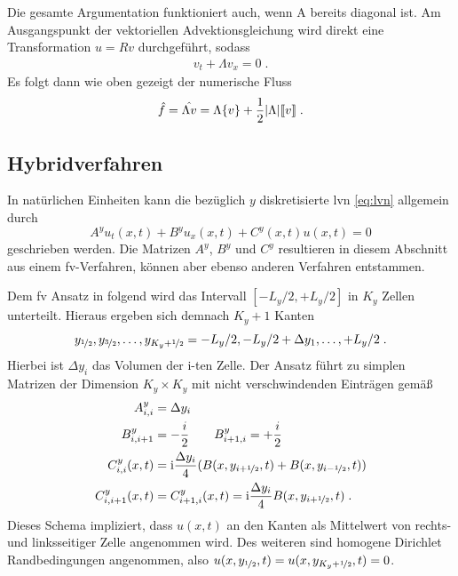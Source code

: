 Die gesamte Argumentation funktioniert auch, wenn A bereits diagonal ist. Am Ausgangspunkt der vektoriellen Advektionsgleichung wird direkt eine Transformation $u=Rv$ durchgeführt, sodass
\begin{align}
  v_t + \Lambda v_x = 0 \; .
\end{align}
Es folgt dann wie oben gezeigt der numerische Fluss
\begin{align}
  \hat{f} = \hat{\Lambda v} = \Lambda\{ v \} + \frac{1}{2}|\Lambda|\llbracket v \rrbracket \; .
  \label{eq:FLUX}
\end{align}


\subsection{Hybridverfahren}\label{sec:Hybridverfahren}
In natürlichen Einheiten kann die bezüglich $y$ diskretisierte \ac{lvn} \eqref{eq:lvn} allgemein durch
\begin{equation}
  {A}^y u_t(x,t) + {B}^y u_x(x,t) + {C}^y(x,t)u(x,t) = 0
  \label{eq:qschema}
\end{equation}
geschrieben werden. Die Matrizen  ${A}^y$, ${B}^y$ und ${C}^y$ resultieren in diesem Abschnitt aus einem \ac{fv}-Verfahren, können aber ebenso anderen Verfahren entstammen.

Dem \ac{fv} Ansatz in \cite{lukas1} folgend wird das Intervall ${[-L_y/2,+L_y/2]}$ in $K_y$ Zellen unterteilt. Hieraus ergeben sich demnach $K_y+1$ Kanten
\begin{equation*}
  {y_{\nicefrac{1}{2}}, y_{\nicefrac{3}{2}}, \dots, y_{K_y + \nicefrac{1}{2}} = -L_y/2, -L_y/2+\Delta y_1,\dots,+L_y/2} \; .
\end{equation*}
Hierbei ist $\Delta y_i$ das Volumen der i-ten Zelle. Der Ansatz führt zu simplen Matrizen der Dimension ${K_y\times K_y}$ mit nicht verschwindenden Einträgen gemäß
\begin{equation}
  \begin{aligned}
  {A}^y_{i,i} &= \Delta y_i \\
  {B}^y_{i,i+1} &= -\frac{i}{2} \qquad
  {B}^y_{i+1, i} = +\frac{i}{2}  \\
  {C}^y_{i,i}(x,t) &= \mathrm{i} \frac{\Delta y_i}{4} (B(x, y_{i+\nicefrac{1}{2}},t) + B(x, y_{i-\nicefrac{1}{2}},t))  \\
  {C}^y_{i,i+1}(x,t) &= C^y_{i+1,i}(x,t) = \mathrm{i} \frac{\Delta y_i}{4} B(x, y_{i+\nicefrac{1}{2}},t)  \; .
  \end{aligned}
  \label{eq:ABC}
\end{equation}
Dieses Schema impliziert, dass $u(x,t)$ an den Kanten als Mittelwert von rechts- und linksseitiger Zelle angenommen wird. Des weiteren sind  homogene Dirichlet Randbedingungen angenommen, also ${u(x,y_{\nicefrac{1}{2}}, t) = u(x,y_{K_y+\nicefrac{1}{2}}, t) = 0}$.

